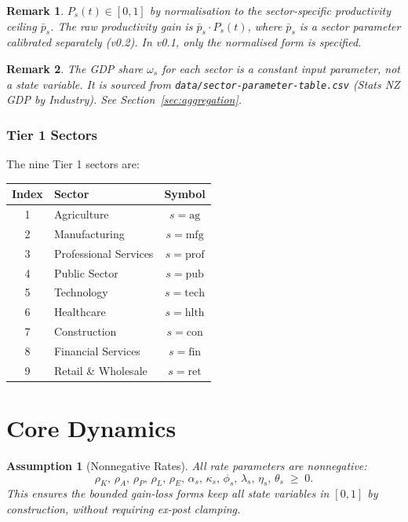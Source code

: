 \documentclass[11pt,a4paper]{article}
\newtheorem{assumption}{Assumption}
\newtheorem{remark}{Remark}
\begin{document}
\begin{remark}
$P_s(t) \in [0,1]$ by normalisation to the sector-specific productivity ceiling $\bar{p}_s$. The raw productivity gain is $\bar{p}_s \cdot P_s(t)$, where $\bar{p}_s$ is a sector parameter calibrated separately (v0.2). In v0.1, only the normalised form is specified.
\end{remark}

\begin{remark}
The GDP share $\omega_s$ for each sector is a constant input parameter, not a state variable. It is sourced from \texttt{data/sector-parameter-table.csv} (Stats NZ GDP by Industry). See Section~\ref{sec:aggregation}.
\end{remark}

\subsubsection*{Tier 1 Sectors}

The nine Tier 1 sectors are:

\begin{center}
\begin{tabular}{clc}
\toprule
Index & Sector & Symbol \\
\midrule
1 & Agriculture & $s = \text{ag}$ \\
2 & Manufacturing & $s = \text{mfg}$ \\
3 & Professional Services & $s = \text{prof}$ \\
4 & Public Sector & $s = \text{pub}$ \\
5 & Technology & $s = \text{tech}$ \\
6 & Healthcare & $s = \text{hlth}$ \\
7 & Construction & $s = \text{con}$ \\
8 & Financial Services & $s = \text{fin}$ \\
9 & Retail \& Wholesale & $s = \text{ret}$ \\
\bottomrule
\end{tabular}
\end{center}

\section{Core Dynamics}

\begin{assumption}[Nonnegative Rates]
All rate parameters are nonnegative:
\[
\rho_K,\, \rho_A,\, \rho_P,\, \rho_L,\, \rho_E,\, \alpha_s,\, \kappa_s,\, \phi_s,\, \lambda_s,\, \eta_s,\, \theta_s \;\geq\; 0.
\]
This ensures the bounded gain-loss forms keep all state variables in $[0,1]$ by construction, without requiring ex-post clamping.
\end{assumption}
\end{document}

